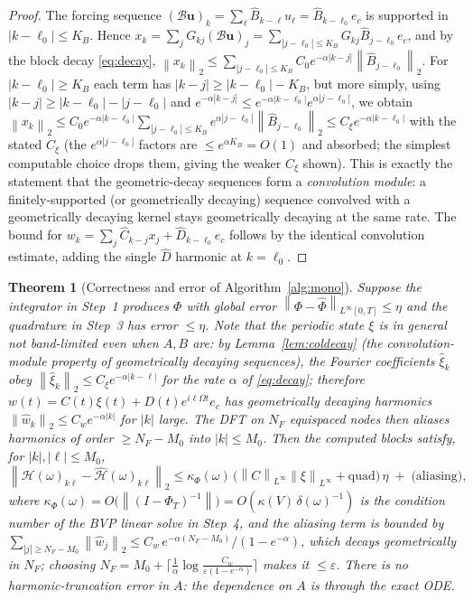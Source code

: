 \documentclass{amsart}
\newtheorem{theorem}{Theorem}
\theoremstyle{definition}
\newcommand{\norm}[1]{\left\lVert#1\right\rVert}
\newcommand{\Bcal}{\mathcal{B}}
\newcommand{\Hcal}{\mathcal{H}}
\begin{document}
\begin{proof}
The forcing sequence $(\Bcal\mathbf u)_k=\sum_\ell\hat B_{k-\ell}u_\ell
=\hat B_{k-\ell_0}e_c$ is supported in $|k-\ell_0|\le K_B$. Hence
$x_k=\sum_j G_{kj}(\Bcal\mathbf u)_j=\sum_{|j-\ell_0|\le K_B}G_{kj}\hat
B_{j-\ell_0}e_c$, and by the block decay \eqref{eq:decay},
$\norm{x_k}_2\le\sum_{|j-\ell_0|\le K_B}C_0 e^{-\alpha|k-j|}\norm{\hat
B_{j-\ell_0}}_2$. For $|k-\ell_0|\ge K_B$ each term has
$|k-j|\ge|k-\ell_0|-K_B$, but more simply, using $|k-j|\ge|k-\ell_0|-|j-\ell_0|$
and $e^{-\alpha|k-j|}\le e^{-\alpha|k-\ell_0|}e^{\alpha|j-\ell_0|}$, we obtain
$\norm{x_k}_2\le C_0 e^{-\alpha|k-\ell_0|}\sum_{|j-\ell_0|\le K_B}
e^{\alpha|j-\ell_0|}\norm{\hat B_{j-\ell_0}}_2\le C_\xi e^{-\alpha|k-\ell_0|}$
with the stated $C_\xi$ (the $e^{\alpha|j-\ell_0|}$ factors are $\le e^{\alpha
K_B}=O(1)$ and absorbed; the simplest computable choice drops them, giving the
weaker $C_\xi$ shown). This is exactly the statement that the geometric-decay
sequences form a \emph{convolution module}: a finitely-supported (or
geometrically decaying) sequence convolved with a geometrically decaying kernel
stays geometrically decaying at the same rate. The bound for
$w_k=\sum_j\hat C_{k-j}x_j+\hat D_{k-\ell_0}e_c$ follows by the identical
convolution estimate, adding the single $\hat D$ harmonic at $k=\ell_0$.
\end{proof}

\begin{theorem}[Correctness and error of Algorithm~\ref{alg:mono}]\label{thm:mono}
Suppose the integrator in Step~1 produces $\Phi$ with global error
$\norm{\Phi-\hat\Phi}_{L^\infty[0,T]}\le\eta$ and the quadrature in Step~3 has
error $\le\eta$. Note that the periodic state $\xi$ is in general \emph{not}
band-limited even when $A,B$ are: by Lemma~\ref{lem:coldecay} (the convolution-module property of
geometrically decaying sequences), the Fourier coefficients $\hat\xi_k$
obey $\norm{\hat\xi_k}_2\le C_\xi e^{-\alpha|k-\ell|}$ for the rate $\alpha$ of
\eqref{eq:decay}; therefore $w(t)=C(t)\xi(t)+D(t)e^{i\ell\Omega t}e_c$ has
geometrically decaying harmonics $\norm{\hat w_k}_2\le C_w e^{-\alpha|k|}$ for
$|k|$ large. The DFT on $N_F$ equispaced nodes then aliases harmonics of order
$\ge N_F-M_0$ into $|k|\le M_0$. Then the
computed blocks satisfy, for $|k|,|\ell|\le M_0$,
\begin{equation}\label{eq:monoerr}
\norm{\Hcal(\omega)_{k\ell}-\widehat{\Hcal}(\omega)_{k\ell}}_2
\le \kappa_\Phi(\omega)\,\big(\norm{C}_{L^\infty}\norm{\xi}_{L^\infty}+\text{quad}\big)\,\eta
\;+\;\text{(aliasing)},
\end{equation}
where $\kappa_\Phi(\omega)=O\!\big(\norm{(I-\Phi_T)^{-1}}\big)
=O(\kappa(V)\,\delta(\omega)^{-1})$ is the condition number of the BVP linear solve in
Step~4, and the aliasing term is bounded by
$\sum_{|j|\ge N_F-M_0}\norm{\hat w_j}_2\le C_w\,e^{-\alpha(N_F-M_0)}/(1-e^{-\alpha})$,
which decays geometrically in $N_F$; choosing
$N_F=M_0+\lceil\tfrac1\alpha\log\tfrac{C_w}{\varepsilon(1-e^{-\alpha})}\rceil$
makes it $\le\varepsilon$. There is \emph{no} harmonic-truncation error in $A$:
the dependence on $A$ is through the exact ODE.
\end{theorem}
\end{document}
